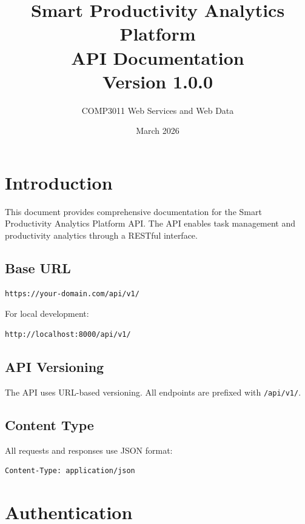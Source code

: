 \documentclass[11pt,a4paper]{article}
\title{\textbf{Smart Productivity Analytics Platform}\\[0.3cm]\Large API Documentation\\[0.2cm]\normalsize Version 1.0.0}
\author{COMP3011 Web Services and Web Data}
\date{March 2026}
\begin{document}
\maketitle
\thispagestyle{fancy}

\tableofcontents
\newpage

\section{Introduction}

This document provides comprehensive documentation for the Smart Productivity Analytics Platform API. The API enables task management and productivity analytics through a RESTful interface.

\subsection{Base URL}

\begin{lstlisting}[style=bash]
https://your-domain.com/api/v1/
\end{lstlisting}

For local development:
\begin{lstlisting}[style=bash]
http://localhost:8000/api/v1/
\end{lstlisting}

\subsection{API Versioning}

The API uses URL-based versioning. All endpoints are prefixed with \texttt{/api/v1/}.

\subsection{Content Type}

All requests and responses use JSON format:
\begin{lstlisting}[style=bash]
Content-Type: application/json
\end{lstlisting}

\section{Authentication}
\end{document}
